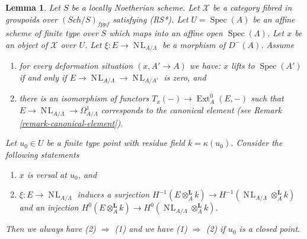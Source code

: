 \documentclass[10pt,a4paper]{amsart}
\theoremstyle{plain}
\newtheorem{lemma}[subsection]{Lemma}
\theoremstyle{definition}
\theoremstyle{remark}
\numberwithin{equation}{subsection}
\def\Spec{\mathop{\mathrm{Spec}}}
\def\Ext{\mathop{\mathrm{Ext}}\nolimits}
\def\Sch{\mathit{Sch}}
\def\NL{\mathop{N\!L}\nolimits}
\begin{document}
\begin{lemma}
\label{lemma-characterize-versal}
Let $S$ be a locally Noetherian scheme. Let $\mathcal{X}$ be a category
fibred in groupoids over $(\Sch/S)_{fppf}$ satisfying (RS*).
Let $U = \Spec(A)$ be an
affine scheme of finite type over $S$ which maps into an affine open
$\Spec(\Lambda)$. Let $x$ be an object of $\mathcal{X}$ over $U$.
Let $\xi : E \to \NL_{A/\Lambda}$ be a morphism of $D^{-}(A)$. Assume
\begin{enumerate}
\item[(i)] for every deformation situation $(x, A' \to A)$ we have:
$x$ lifts to $\Spec(A')$ if and only if
$E \to \NL_{A/\Lambda} \to \NL_{A/A'}$ is zero, and
\item[(ii)] there is an isomorphism of functors
$T_x(-) \to \Ext^0_A(E, -)$
such that $E \to \NL_{A/\Lambda} \to \Omega^1_{A/\Lambda}$
corresponds to the canonical element (see
Remark \ref{remark-canonical-element}).
\end{enumerate}
Let $u_0 \in U$ be a finite type point with residue field
$k = \kappa(u_0)$. Consider the following statements
\begin{enumerate}
\item $x$ is versal at $u_0$, and
\item $\xi : E \to \NL_{A/\Lambda}$ induces a surjection
$H^{-1}(E \otimes_A^{\mathbf{L}} k) \to
H^{-1}(\NL_{A/\Lambda} \otimes_A^{\mathbf{L}} k)$
and an injection
$H^0(E \otimes_A^{\mathbf{L}} k) \to
H^0(\NL_{A/\Lambda} \otimes_A^{\mathbf{L}} k)$.
\end{enumerate}
Then we always have (2) $\Rightarrow$ (1) and we have (1) $\Rightarrow$ (2)
if $u_0$ is a closed point.
\end{lemma}
\end{document}
